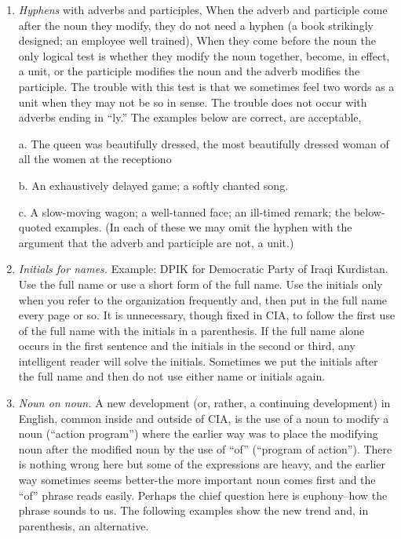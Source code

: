\documentclass[
    oneside,
    11pt,
    draft
]{memoir}
\begin{document}
\begin{enumerate}
  (1) \enquote{Albania, as far as her relations with the USSR are concerned, will\dots.} Revised: Albania, in her relations with the USSR, will\dots. 
  
  (2) \enquote{As far as per-diem vouchers are concerned, the instruction requires that\dots.} Revised: the instruction on per-diem vouchers requires that\dots." 
  
  \item \emph{Hyphens} with adverbs and participles, When the adverb and participle come after the noun they modify, they do not need a hyphen (a book strikingly designed; an employee well trained), When they come before the noun the only logical test is whether they modify the noun together, become, in effect, a unit, or the participle modifies the noun and the adverb modifies the participle. The trouble with this test is that we sometimes feel two words as a unit when they may not be so in sense. The trouble does not occur with adverbs ending in \enquote{ly.} The examples below are correct, are acceptable, 
  
  a. The queen was beautifully dressed, the most beautifully dressed woman of all the women at the receptiono 
  
  b. An exhaustively delayed game; a softly chanted song.
  
  c. A slow-moving wagon; a well-tanned face; an ill-timed remark; the below-quoted examples. (In each of these we may omit the hyphen with the argument that the adverb and participle are not, a unit.) 
  
  \item \emph{Initials for names.} Example: DPIK for Democratic Party of Iraqi Kurdistan. Use the full name or use a short form of the full name. Use the initials only when you refer to the organization frequently and, then put in the full name every page or so. It is unnecessary, though fixed in CIA, to follow the first use of the full name with the initials in a parenthesis. If the full name alone occurs in the first sentence and the initials in the second or third, any intelligent reader will solve the initials. Sometimes we put the initials after the full name and then do not use either name or initials again. 
  
  \item \emph{Noun on noun.} A new development (or, rather, a continuing development) in English, common inside and outside of CIA, is the use of a noun to modify a noun (\enquote{action program}) where the earlier way was to place the modifying noun after the modified noun by the use of \enquote{of} (\enquote{program of action}). There is nothing wrong here but some of the expressions are heavy, and the earlier way sometimes seems better-the more important noun comes first and the \enquote{of} phrase reads easily. Perhaps the chief question here is euphony--how the phrase sounds to us. The following examples show the new trend and, in parenthesis, an alternative.
  

\end{enumerate}
\end{document}
